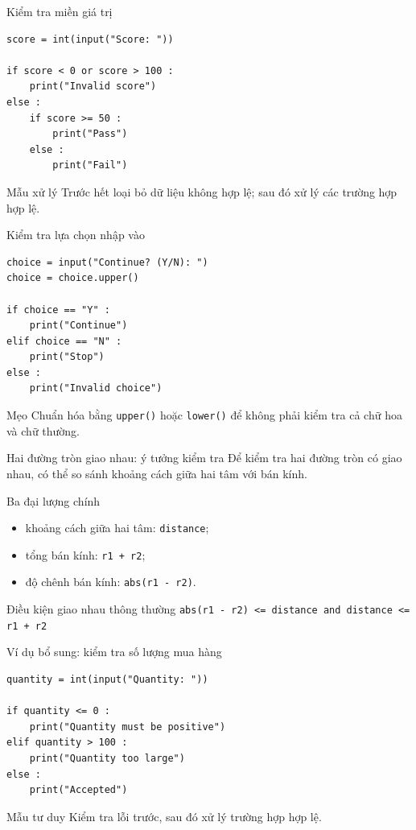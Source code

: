 \documentclass[aspectratio=169,11pt]{beamer}
\newcommand{\code}[1]{\texttt{#1}}
\begin{document}
\begin{frame}[fragile]{Kiểm tra miền giá trị}
\begin{lstlisting}[style=py]
score = int(input("Score: "))

if score < 0 or score > 100 :
    print("Invalid score")
else :
    if score >= 50 :
        print("Pass")
    else :
        print("Fail")
\end{lstlisting}
\begin{block}{Mẫu xử lý}
Trước hết loại bỏ dữ liệu không hợp lệ; sau đó xử lý các trường hợp hợp lệ.
\end{block}
\end{frame}

\begin{frame}[fragile]{Kiểm tra lựa chọn nhập vào}
\begin{lstlisting}[style=py]
choice = input("Continue? (Y/N): ")
choice = choice.upper()

if choice == "Y" :
    print("Continue")
elif choice == "N" :
    print("Stop")
else :
    print("Invalid choice")
\end{lstlisting}
\begin{exampleblock}{Mẹo}
Chuẩn hóa bằng \code{upper()} hoặc \code{lower()} để không phải kiểm tra cả chữ hoa và chữ thường.
\end{exampleblock}
\end{frame}

\begin{frame}{Hai đường tròn giao nhau: ý tưởng kiểm tra}
Để kiểm tra hai đường tròn có giao nhau, có thể so sánh khoảng cách giữa hai tâm với bán kính.
\begin{block}{Ba đại lượng chính}
\begin{itemize}
  \item khoảng cách giữa hai tâm: \code{distance};
  \item tổng bán kính: \code{r1 + r2};
  \item độ chênh bán kính: \code{abs(r1 - r2)}.
\end{itemize}
\end{block}
\begin{exampleblock}{Điều kiện giao nhau thông thường}
\code{abs(r1 - r2) <= distance and distance <= r1 + r2}
\end{exampleblock}
\end{frame}



\begin{frame}[fragile]{Ví dụ bổ sung: kiểm tra số lượng mua hàng}
\begin{lstlisting}[style=py]
quantity = int(input("Quantity: "))

if quantity <= 0 :
    print("Quantity must be positive")
elif quantity > 100 :
    print("Quantity too large")
else :
    print("Accepted")
\end{lstlisting}
\begin{block}{Mẫu tư duy}
Kiểm tra lỗi trước, sau đó xử lý trường hợp hợp lệ.
\end{block}
\end{frame}
\end{document}

